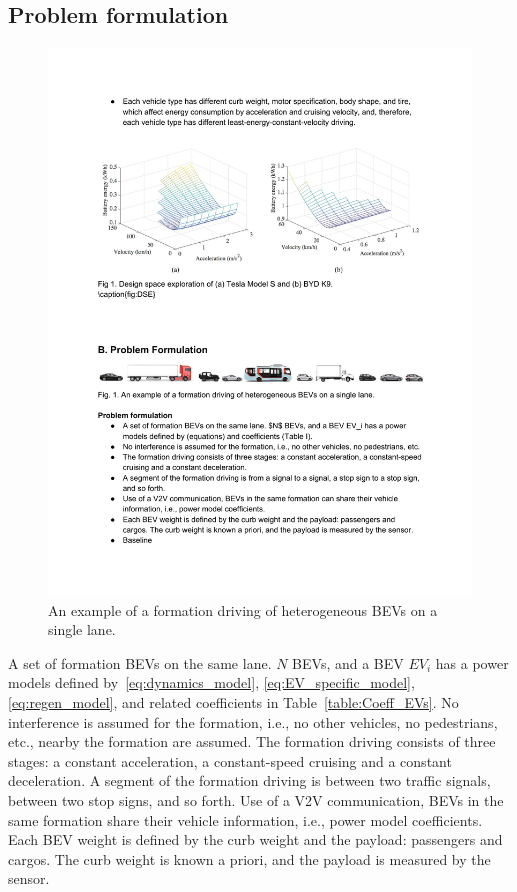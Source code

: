 \documentclass{IEEEtran}
\begin{document}
\subsection{Problem formulation} \label{subsec:problem}

\begin{figure}	%
\centering
\includegraphics[width=1.0\hsize]{Figures/Example.pdf}
\caption{An example of a formation driving of heterogeneous BEVs on a single lane.}
\label{fig:example}
\end{figure} 

A set of formation BEVs on the same lane. $N$ BEVs, and a BEV $EV_i$ has a power models defined by~\eqref{eq:dynamics_model}, \eqref{eq:EV_specific_model}, \eqref{eq:regen_model}, and related coefficients in Table~\ref{table:Coeff_EVs}.
No interference is assumed for the formation, i.e.,  no other vehicles, no pedestrians, etc., nearby the formation are assumed.
The formation driving consists of three stages: a constant acceleration, a constant-speed cruising and a constant deceleration.
A segment of the formation driving is between two traffic signals, between two stop signs, and so forth.
Use of a V2V communication, BEVs in the same formation share their vehicle information, i.e., power model coefficients.
Each BEV weight is defined by the curb weight and the payload: passengers and cargos. The curb weight is known a priori, and the payload is measured by the sensor. 
\end{document}
